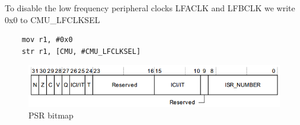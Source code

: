 To disable the low frequency peripheral clocks LFACLK and LFBCLK we write 0x0 to CMU\_LFCLKSEL

\begin{lstlisting}
	mov r1, #0x0
	str r1, [CMU, #CMU_LFCLKSEL]
\end{lstlisting}

\begin{figure}[ht]
 \centering
 \includegraphics[width=\textwidth]{images/psrMap.png}
 \caption{PSR bitmap}
 \label{fig:psrMap}
\end{figure}